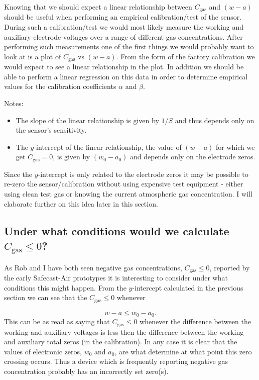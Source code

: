 \documentclass[letterpaper]{article}
\newcommand{\cgas}{C_{\mathrm{gas}}}
\newcommand{\wrk}{w}
\newcommand{\aux}{a}
\begin{document}
Knowing that we should expect a linear relationship between $\cgas$ and
$(\wrk-\aux)$ should be useful when performing an empirical calibration/test of
the sensor. During such a calibration/test we would most likely measure the
working and auxiliary electrode voltages over a range of different gas
concentrations. After performing such measurements one of the first things we
would probably want to look at is a plot of $\cgas$  vs $(\wrk-\aux)$.  From
the form of the factory calibration we would expect to see a linear
relationship in the plot.  In addition we should be able to perform a  linear
regression on this data in
order to determine empirical values for the calibration coefficients $\alpha$
and $\beta$. 

Notes:
\begin{itemize}

    \item The slope of the linear relationship is given by $1/S $ and thus
        depends only on the sensor's sensitivity.   

    \item The $y$-intercept of the linear relationship, the value of $(\wrk -
        \aux)$ for which we get $\cgas = 0$, is given by $(\wrk_0 - \aux_0)$
        and  depends only on the electrode zeros.  
\end{itemize}

Since the $y$-intercept is only related to the electrode zeros it may be
possible to re-zero the sensor/calibration without using expensive test
equipment - either using clean test gas or knowing the current atmospheric gas
concentration. I will elaborate further on this idea later in this section.


\subsection{Under what conditions would we calculate $\cgas \leq 0$?} 

As Rob and I have both seen negative gas concentrations, $\cgas \leq 0$,
reported by the early Safecast-Air prototypes it is interesting to consider
under what conditions this might happen.  From the $y$-intercept calculated in
the previous section we can see that the $\cgas \leq 0$ whenever

\begin{equation}  \label{zerocond2}
    \wrk-\aux \leq \wrk_0 - \aux_0.
\end{equation}
This can be as read as saying that $\cgas \leq 0$ whenever the difference
between the working and auxiliary voltages is less then the difference between
the working and auxiliary total zeros (in the calibration).  In any case it
is clear that  the values of electronic zeros, $\wrk_0$ and $\aux_0$,  are what
determine at what point this zero crossing occurs. Thus a device which is frequently
reporting negative gas concentration probably has an incorrectly set zero(s). 
\end{document}
